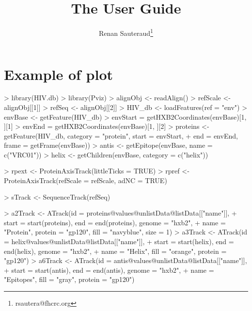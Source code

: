 \documentclass[11pt]{article}
\author{Renan Sauteraud\footnote{rsautera@fhcrc.org}}
\newcommand{\mgg}[0]{\Rpackage{Pviz} }
\begin{document}
\title{The \mgg User Guide}
\maketitle


\section{Example of plot}
\begin{Schunk}
\begin{Sinput}
> library(HIV.db)
> library(Pviz)
> alignObj <- readAlign()
> refScale <- alignObj[[1]]
> refSeq <- alignObj[[2]]
> HIV_db <- loadFeatures(ref = "env")
> envBase <- getFeature(HIV_db)
> envStart = getHXB2Coordinates(envBase)[1, ][1]
> envEnd = getHXB2Coordinates(envBase)[1, ][2]
> proteins <- getFeature(HIV_db, category = "protein", start = envStart, 
+     end = envEnd, frame = getFrame(envBase))
> antis <- getEpitope(envBase, name = c("VRC01"))
> helix <- getChildren(envBase, category = c("helix"))
\end{Sinput}
\end{Schunk}

\begin{Schunk}
\begin{Sinput}
> rpext <- ProteinAxisTrack(littleTicks = TRUE)
> rpref <- ProteinAxisTrack(refScale = refScale, adNC = TRUE)
\end{Sinput}
\end{Schunk}

\begin{Schunk}
\begin{Sinput}
> sTrack <- SequenceTrack(refSeq)
\end{Sinput}
\end{Schunk}

\begin{Schunk}
\end{Schunk}

\begin{Schunk}
\begin{Sinput}
> a2Track <- ATrack(id = proteins@values@unlistData@listData[["name"]], 
+     start = start(proteins), end = end(proteins), genome = "hxb2", 
+     name = "Protein", protein = "gp120", fill = "navyblue", size = 1)
> a3Track <- ATrack(id = helix@values@unlistData@listData[["name"]], 
+     start = start(helix), end = end(helix), genome = "hxb2", 
+     name = "Helix", fill = "orange", protein = "gp120")
> a6Track <- ATrack(id = antis@values@unlistData@listData[["name"]], 
+     start = start(antis), end = end(antis), genome = "hxb2", 
+     name = "Epitopes", fill = "gray", protein = "gp120")
\end{Sinput}
\end{Schunk}
\end{document}
